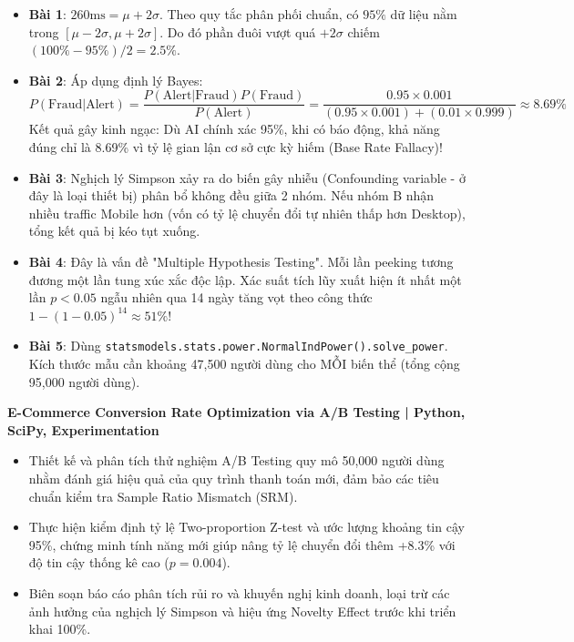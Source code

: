 \begin{dapanbox}
\begin{itemize}
    \item \textbf{Bài 1}: $260\text{ms} = \mu + 2\sigma$. Theo quy tắc phân phối chuẩn, có $95\%$ dữ liệu nằm trong $[\mu - 2\sigma, \mu + 2\sigma]$. Do đó phần đuôi vượt quá $+2\sigma$ chiếm $(100\% - 95\%) / 2 = 2.5\%$.
    \item \textbf{Bài 2}: Áp dụng định lý Bayes:
    \[
    P(\text{Fraud}|\text{Alert}) = \frac{P(\text{Alert}|\text{Fraud}) P(\text{Fraud})}{P(\text{Alert})} = \frac{0.95 \times 0.001}{(0.95 \times 0.001) + (0.01 \times 0.999)} \approx 8.69\%
    \]
    Kết quả gây kinh ngạc: Dù AI chính xác 95\%, khi có báo động, khả năng đúng chỉ là 8.69\% vì tỷ lệ gian lận cơ sở cực kỳ hiếm (Base Rate Fallacy)!
    \item \textbf{Bài 3}: Nghịch lý Simpson xảy ra do biến gây nhiễu (Confounding variable - ở đây là loại thiết bị) phân bổ không đều giữa 2 nhóm. Nếu nhóm B nhận nhiều traffic Mobile hơn (vốn có tỷ lệ chuyển đổi tự nhiên thấp hơn Desktop), tổng kết quả bị kéo tụt xuống.
    \item \textbf{Bài 4}: Đây là vấn đề "Multiple Hypothesis Testing". Mỗi lần peeking tương đương một lần tung xúc xắc độc lập. Xác suất tích lũy xuất hiện ít nhất một lần $p < 0.05$ ngẫu nhiên qua 14 ngày tăng vọt theo công thức $1 - (1 - 0.05)^{14} \approx 51\%$!
    \item \textbf{Bài 5}: Dùng \texttt{statsmodels.stats.power.NormalIndPower().solve\_power}. Kích thước mẫu cần khoảng 47,500 người dùng cho MỖI biến thể (tổng cộng 95,000 người dùng).
\end{itemize}
\end{dapanbox}

\begin{cvtipbox}
\textbf{E-Commerce Conversion Rate Optimization via A/B Testing | Python, SciPy, Experimentation}
\begin{itemize}
    \item Thiết kế và phân tích thử nghiệm A/B Testing quy mô 50,000 người dùng nhằm đánh giá hiệu quả của quy trình thanh toán mới, đảm bảo các tiêu chuẩn kiểm tra Sample Ratio Mismatch (SRM).
    \item Thực hiện kiểm định tỷ lệ Two-proportion Z-test và ước lượng khoảng tin cậy 95\%, chứng minh tính năng mới giúp nâng tỷ lệ chuyển đổi thêm +8.3\% với độ tin cậy thống kê cao ($p = 0.004$).
    \item Biên soạn báo cáo phân tích rủi ro và khuyến nghị kinh doanh, loại trừ các ảnh hưởng của nghịch lý Simpson và hiệu ứng Novelty Effect trước khi triển khai 100\%.
\end{itemize}
\end{cvtipbox}

